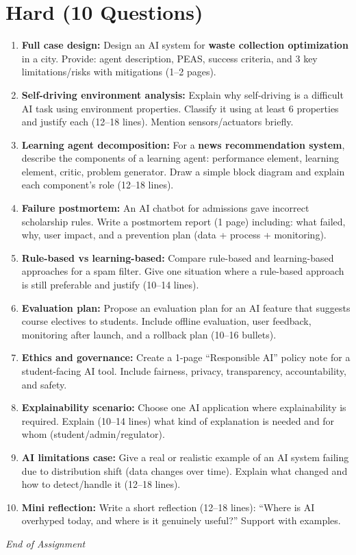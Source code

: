 \documentclass[11pt,a4paper]{article}
\begin{document}
\section*{Hard (10 Questions)}
\begin{enumerate}[label=H\arabic*., leftmargin=*]
  \item \textbf{Full case design:} Design an AI system for \textbf{waste collection optimization} in a city.
    Provide: agent description, PEAS, success criteria, and 3 key limitations/risks with mitigations (1--2 pages).

  \item \textbf{Self-driving environment analysis:} Explain why self-driving is a difficult AI task using environment properties.
    Classify it using at least 6 properties and justify each (12--18 lines). Mention sensors/actuators briefly.

  \item \textbf{Learning agent decomposition:} For a \textbf{news recommendation system}, describe the components of a learning agent:
    performance element, learning element, critic, problem generator.
    Draw a simple block diagram and explain each component's role (12--18 lines).

  \item \textbf{Failure postmortem:} An AI chatbot for admissions gave incorrect scholarship rules.
    Write a postmortem report (1 page) including: what failed, why, user impact, and a prevention plan (data + process + monitoring).

  \item \textbf{Rule-based vs learning-based:} Compare rule-based and learning-based approaches for a spam filter.
    Give one situation where a rule-based approach is still preferable and justify (10--14 lines).

  \item \textbf{Evaluation plan:} Propose an evaluation plan for an AI feature that suggests course electives to students.
    Include offline evaluation, user feedback, monitoring after launch, and a rollback plan (10--16 bullets).

  \item \textbf{Ethics and governance:} Create a 1-page ``Responsible AI'' policy note for a student-facing AI tool.
    Include fairness, privacy, transparency, accountability, and safety.

  \item \textbf{Explainability scenario:} Choose one AI application where explainability is required.
    Explain (10--14 lines) what kind of explanation is needed and for whom (student/admin/regulator).

  \item \textbf{AI limitations case:} Give a real or realistic example of an AI system failing due to distribution shift (data changes over time).
    Explain what changed and how to detect/handle it (12--18 lines).

  \item \textbf{Mini reflection:} Write a short reflection (12--18 lines):
    ``Where is AI overhyped today, and where is it genuinely useful?'' Support with examples.
\end{enumerate}

\vfill
\noindent\textit{End of Assignment}
\end{document}
